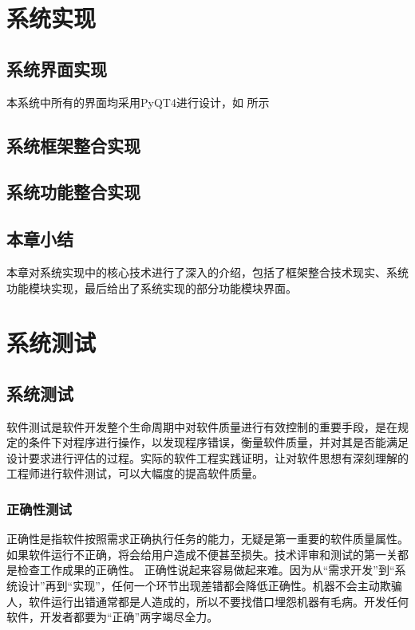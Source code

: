\documentclass{zjutthesis}
\begin{document}
\chapter{系统实现}

\section{系统界面实现}
本系统中所有的界面均采用PyQT4进行设计，如%
所示

\section{系统框架整合实现}

\section{系统功能整合实现}

\section{本章小结}
本章对系统实现中的核心技术进行了深入的介绍，包括了框架整合技术现实、系统功能模块实现，最后给出了系统实现的部分功能模块界面。


\chapter{系统测试}
\section{系统测试}
软件测试是软件开发整个生命周期中对软件质量进行有效控制的重要手段，是在规定的条件下对程序进行操作，以发现程序错误，衡量软件质量，并对其是否能满足设计要求进行评估的过程。实际的软件工程实践证明，让对软件思想有深刻理解的工程师进行软件测试，可以大幅度的提高软件质量。

\subsection{正确性测试}
正确性是指软件按照需求正确执行任务的能力，无疑是第一重要的软件质量属性。如果软件运行不正确，将会给用户造成不便甚至损失。技术评审和测试的第一关都是检查工作成果的正确性。
正确性说起来容易做起来难。因为从“需求开发”到“系统设计”再到“实现”，任何一个环节出现差错都会降低正确性。机器不会主动欺骗人，软件运行出错通常都是人造成的，所以不要找借口埋怨机器有毛病。开发任何软件，开发者都要为“正确”两字竭尽全力。
\end{document}
